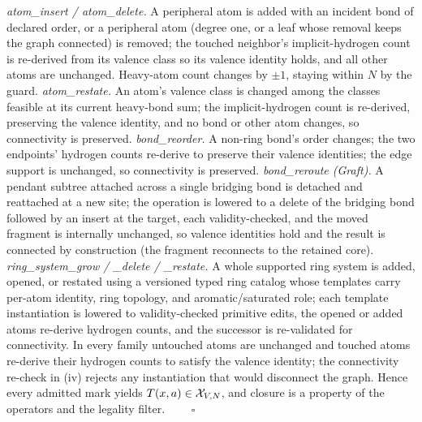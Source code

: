 \emph{atom\_insert / atom\_delete.} A peripheral atom is added with an incident bond of declared order, or
a peripheral atom (degree one, or a leaf whose removal keeps the graph connected) is removed; the touched
neighbor's implicit-hydrogen count is re-derived from its valence class so its valence identity holds, and
all other atoms are unchanged. Heavy-atom count changes by $\pm1$, staying within $N$ by the guard.
\emph{atom\_restate.} An atom's valence class is changed among the classes feasible at its current
heavy-bond sum; the implicit-hydrogen count is re-derived, preserving the valence identity, and no bond or
other atom changes, so connectivity is preserved. \emph{bond\_reorder.} A non-ring bond's order changes;
the two endpoints' hydrogen counts re-derive to preserve their valence identities; the edge support is
unchanged, so connectivity is preserved. \emph{bond\_reroute (Graft).} A pendant subtree attached across a
single bridging bond is detached and reattached at a new site; the operation is lowered to a delete of the
bridging bond followed by an insert at the target, each validity-checked, and the moved fragment is
internally unchanged, so valence identities hold and the result is connected by construction (the fragment
reconnects to the retained core). \emph{ring\_system\_grow / \_delete / \_restate.} A whole supported ring
system is added, opened, or restated using a versioned typed ring catalog whose templates carry per-atom
identity, ring topology, and aromatic/saturated role; each template instantiation is lowered to
validity-checked primitive edits, the opened or added atoms re-derive hydrogen counts, and the successor
is re-validated for connectivity. In every family untouched atoms are unchanged and touched atoms re-derive
their hydrogen counts to satisfy the valence identity; the connectivity re-check in (iv) rejects any
instantiation that would disconnect the graph. Hence every admitted mark yields $T(x,a)\in\mathcal{X}_{V,N}$, and
closure is a property of the operators and the legality filter. $\qquad\square$

